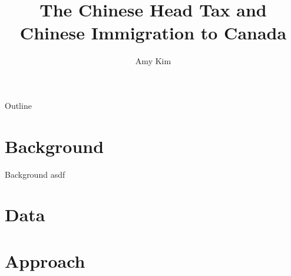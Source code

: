 \documentclass[pdf]{beamer}
\title{The Chinese Head Tax and Chinese Immigration to Canada}
\author{Amy Kim}
\begin{document}
\begin{frame}
    \titlepage
\end{frame}

\begin{frame}{Outline}
    \tableofcontents
\end{frame}


\section{Background}
\begin{frame}{Background}
    asdf
\end{frame}
\section{Data}

\section{Approach}
\end{document}
